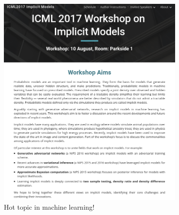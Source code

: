 \documentclass{beamer}
\begin{document}
\begin{frame}
    \frametitle{}

    \begin{center}
        \includegraphics[width=0.7\textwidth]{figures/workshop.png}\\
        {\color{red} Hot topic in machine learning!}
    \end{center}
\end{frame}

%
\end{document}
